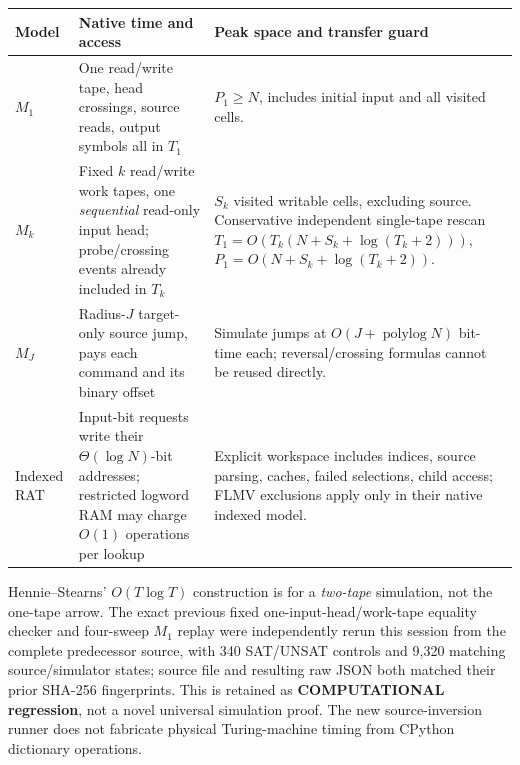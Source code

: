 \documentclass[11pt]{article}
\begin{document}
\begin{center}\small
\begin{tabularx}{\linewidth}{p{.12\linewidth}p{.26\linewidth}X}
\toprule
Model&Native time and access&Peak space and transfer guard\\\midrule
$M_1$&One read/write tape, head crossings, source reads, output symbols all in $T_1$&$P_1\ge N$, includes initial input and all visited cells.\\
$M_k$&Fixed $k$ read/write work tapes, one \emph{sequential} read-only input head; probe/crossing events already included in $T_k$&$S_k$ visited writable cells, excluding source. Conservative independent single-tape rescan $T_1=O(T_k(N+S_k+\log(T_k+2)))$, $P_1=O(N+S_k+\log(T_k+2))$.\\
$M_J$&Radius-$J$ target-only source jump, pays each command and its binary offset&Simulate jumps at $O(J+\operatorname{polylog}N)$ bit-time each; reversal/crossing formulas cannot be reused directly.\\
Indexed RAT&Input-bit requests write their $\Theta(\log N)$-bit addresses; restricted logword RAM may charge $O(1)$ operations per lookup&Explicit workspace includes indices, source parsing, caches, failed selections, child access; FLMV exclusions apply only in their native indexed model.\\\bottomrule
\end{tabularx}
\end{center}
Hennie--Stearns' $O(T\log T)$ construction is for a \emph{two-tape} simulation, not the one-tape arrow. The exact previous fixed one-input-head/work-tape equality checker and four-sweep $M_1$ replay were independently rerun this session from the complete predecessor source, with 340 SAT/UNSAT controls and 9,320 matching source/simulator states; source file and resulting raw JSON both matched their prior SHA-256 fingerprints. This is retained as \textbf{COMPUTATIONAL regression}, not a novel universal simulation proof. The new source-inversion runner does not fabricate physical Turing-machine timing from CPython dictionary operations.
\end{document}
